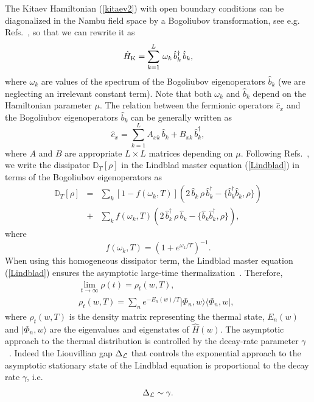 The Kitaev Hamiltonian (\ref{kitaev2}) with open boundary conditions
can be diagonalized in the Nambu field space by a Bogoliubov
transformation, see e.g. Refs.~\cite{Pfeuty-70,BR-book,DR-21}, so that
we can rewrite it as
\begin{equation}
\hat{H}_{\rm K}=\sum_{k=1}^L\,\omega_k \,\hat b^\dagger_k\, \hat b_k,
  \label{Hdiag}
\end{equation}
where $\omega_k$ are values of the spectrum of the Bogoliubov
eigenoperators $\hat b_k$ (we are neglecting an irrelevant constant
term). Note that both $\omega_k$ and $\hat b_k$ depend on the
Hamiltonian parameter $\mu$.  The relation between the fermionic
operators $\hat{c}_x$ and the Bogoliubov eigenoperators $\hat{b}_k$
can be generally written as~\cite{Pfeuty-70,BR-book,DR-21}
\begin{equation}
  \label{transBogol}
  \hat c_x = \sum_{k=1}^L A_{xk} \,\hat{b}_k + B_{xk}
  \,\hat{b}_k^\dagger,
\end{equation}
where $A$ and $B$ are appropriate $L\times L$ matrices depending on
$\mu$.  Following Refs.~\cite{DR-21,PCR-22}, we write the dissipator
$\mathbb{D}_T[\rho]$ in the Lindblad master equation (\ref{Lindblad})
in terms of the Bogoliubov eigenoperators as
\begin{eqnarray}
  \mathbb{D}_T[\rho] &=&
\sum_k [1-f(\omega_k,T)]
\left( 2 \,\hat{b}_k\,\rho\,\hat{b}_k^\dagger - 
\{\hat{b}_k^\dagger\hat{b}_k,\rho\}\right)  \nonumber\\
&+&
\sum_k f(\omega_k,T)
\left( 2 \,\hat{b}_k^\dagger\,\rho\,\hat{b}_k - 
\{\hat{b}_k\hat{b}_k^\dagger,\rho\}\right), \label{Dtrho}
\end{eqnarray}
where
\begin{equation}
  f(\omega_k,T) = \left( 1 + e^{\omega_k/T}\right)^{-1}.
  \label{fomt}
\end{equation}
When using this homogeneous dissipator term, the Lindblad master
equation (\ref{Lindblad}) ensures the asymptotic large-time
thermalization~\cite{DR-21}. Therefore,
\begin{eqnarray}
  &&\lim_{t\to\infty} \rho(t)  = \rho_t(w,T), \label{asyrho}\\
&&\rho_t(w,T) = \sum_n e^{-E_n(w)/T}|\Phi_n, w\rangle \langle \Phi_n, w|,
 \qquad \label{termrho}
\end{eqnarray}
where $\rho_t(w,T)$ is the density matrix representing the thermal
state, $E_n(w)$ and $|\Phi_n, w\rangle$ are the eigenvalues and
eigenstates of $\hat{H}(w)$.  The asymptotic approach to the thermal
distribution is controlled by the decay-rate parameter
$\gamma$~\cite{DR-21}. Indeed the Liouvillian gap $\Delta_{\cal L}$
that controls the exponential approach to the asymptotic stationary
state of the Lindblad equation is proportional to the decay rate
$\gamma$, i.e.
\begin{equation}
  \Delta_{\cal L}\sim \gamma.
  \label{deltal}
  \end{equation}

